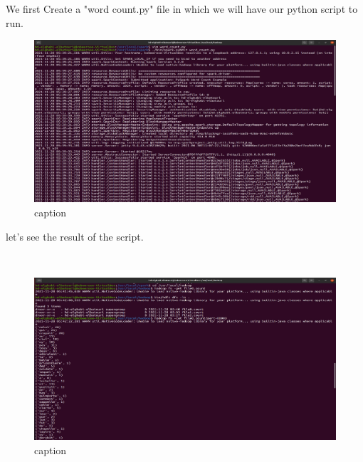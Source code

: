 \begin{spacing}{1.2}
\par We first Create a "word count.py" file in which we will have our python script to run.
\\
\begin{figure}[!htb] 
\begin{center} 
\includegraphics[width=1\linewidth]{Big_Data/Spark/Executing Word_Count using python/running a python script.jpg} 
\end{center} 
\caption{caption} 
\end{figure} 
\FloatBarrier


\par let's see the result of the script.

\\
\begin{figure}[!htb] 
\begin{center} 
\includegraphics[width=1\linewidth]{Big_Data/Spark/Executing Word_Count using python/results of python script.jpg} 
\end{center} 
\caption{caption} 
\end{figure} 
\FloatBarrier



\end{spacing}